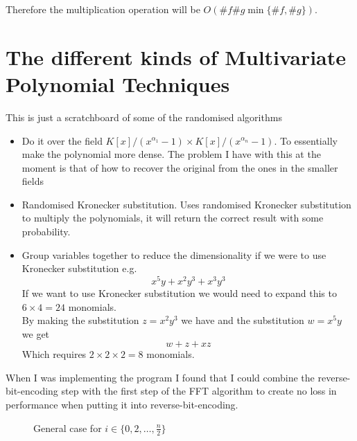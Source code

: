 Therefore the multiplication operation will be $O(\# f \# g \min\{\# f, \# g\})$.


\section{The different kinds of Multivariate Polynomial Techniques}

This is just a scratchboard of some of the randomised algorithms

\begin{itemize}
    \item Do it over the field $K[x]/(x^{\alpha_1} -1) \times K[x]/(x^{\alpha_n} -1)$. To essentially make the polynomial more dense. The problem I have with this at the moment is that of how to recover the original from the ones in the smaller fields
    \item Randomised Kronecker substitution. Uses randomised Kronecker substitution to multiply the polynomials, it will return the correct result with some probability.
    \item Group variables together to reduce the dimensionality if we were to use Kronecker substitution e.g.
        \[
            x^5y + x^2y^3 + x^3y^3
        \]
        If we want to use Kronecker substitution we would need to expand this to $6 \times 4 = 24$ monomials.\\
        By making the substitution $z = x^2y^3$ we have and the substitution $w = x^5y$ we get
        \[
            w + z + xz
        \]
        Which requires $2 \times 2 \times 2 = 8$ monomials.
\end{itemize}

When I was implementing the program I found that I could combine the reverse-bit-encoding step with the first step of the FFT algorithm to create no loss in performance when putting it into reverse-bit-encoding.
\begin{figure}
    \centering
    \caption{General case for $i \in \{0, 2, \ldots, \frac{n}{2}\}$}
\end{figure}


